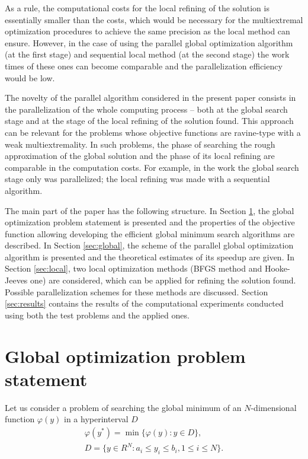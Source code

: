 \documentclass[runningheads]{llncs}
\begin{document}
As a rule, the computational costs for the local refining of the solution is essentially smaller than the costs, which would be necessary for the multiextremal optimization procedures to achieve the same precision as the local method can ensure. However, in the case of using the parallel global optimization algorithm (at the first stage) and sequential local method (at the second stage) the work times of these ones can become comparable and the parallelization efficiency would be low.

The novelty of the parallel algorithm considered in the present paper consists in the parallelization of the whole computing process -- both at the global search stage and at the stage of the local refining of the solution found. This approach can be relevant for the problems whose objective functions are ravine-type with a weak multiextremality. In such problems, the phase of searching the rough approximation of the global solution and the phase of its local refining are comparable in the computation costs.
For example, in the work \cite{Gubaydullin2021} the global search stage only was parallelized; the local refining was made with a sequential algorithm.

The main part of the paper has the following structure. In Section \ref{sec:problem}, the global optimization problem statement is presented and the properties of the objective function allowing developing the efficient global minimum search algorithms are described. In Section \ref{sec:global}, the scheme of the parallel global optimization algorithm is presented and the theoretical estimates of its speedup are given. In Section \ref{sec:local}, two local optimization methods (BFGS method and Hooke-Jeeves one) are considered, which can be applied for refining the solution found. Possible parallelization schemes for these methods are discussed. Section \ref{sec:results} contains the results of the computational experiments conducted using both the test problems and the applied ones.

\section{Global optimization problem statement}\label{sec:problem}

Let us consider a problem of searching the global minimum of an $N$-dimensional function $\varphi(y)$ in a hyperinterval $D$
\begin{gather}
\varphi(y^*) = \min{\{ \varphi(y):y \in D \}}, \label{problemN} \\ 
D = \{ y \in R^{N}: a_i \leq y_i \leq b_i, 1 \leq i \leq N \}. \label{D}
\end{gather}
\end{document}
